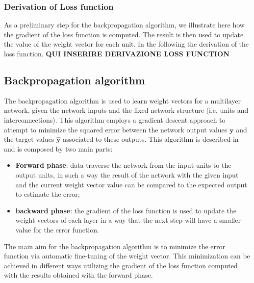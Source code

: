 \subsubsection{Derivation of Loss function}
As a preliminary step for the backpropagation algorithm, we illustrate here how the gradient of the loss function is computed. The result is then used to update the value of the weight vector for each unit. In the following the derivation of the loss function.\newline\newline
\textbf{QUI INSERIRE DERIVAZIONE LOSS FUNCTION}

\subsection{Backpropagation algorithm}
The backpropagation algorithm \cite{haykin_neural_2009} is used to learn weight vectors for a multilayer network, given the network inputs and the fixed network structure (i.e. units and interconnections). This algorithm employs a gradient descent approach to attempt to minimize the squared error between the network output values $\textbf{y}$ and the target values $\hat{\textbf{y}}$ associated to these outputs. This algorithm is described in \cite{MLmitchell} and is composed by two main parts:
\begin{itemize}
    \item \textbf{Forward phase}: data traverse the network from the input units to the output units, in such a way the result of the network with the given input and the current weight vector value can be compared to the expected output to estimate the error;
    \item \textbf{backward phase}: the gradient of the loss function is used to update the weight vectors of each layer in a way that the next step will have a smaller value for the error function.
\end{itemize}
The main aim for the backpropagation algorithm is to minimize the error function via automatic fine-tuning of the weight vector. This minimization can be achieved in different ways utilizing the gradient of the loss function computed with the results obtained with the forward phase.\newline
\cite{MLmitchell}

